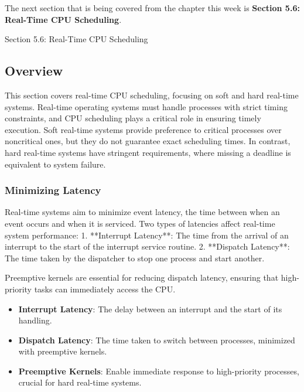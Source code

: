 The next section that is being covered from the chapter this week is \textbf{Section 5.6: Real-Time CPU Scheduling}.

\begin{notes}{Section 5.6: Real-Time CPU Scheduling}
    \subsection*{Overview}

    This section covers real-time CPU scheduling, focusing on soft and hard real-time systems. Real-time operating systems must handle processes with strict timing constraints, and CPU scheduling plays 
    a critical role in ensuring timely execution. Soft real-time systems provide preference to critical processes over noncritical ones, but they do not guarantee exact scheduling times. In contrast, 
    hard real-time systems have stringent requirements, where missing a deadline is equivalent to system failure.
    
    \subsubsection*{Minimizing Latency}
    
    Real-time systems aim to minimize event latency, the time between when an event occurs and when it is serviced. Two types of latencies affect real-time system performance:
    1. **Interrupt Latency**: The time from the arrival of an interrupt to the start of the interrupt service routine.
    2. **Dispatch Latency**: The time taken by the dispatcher to stop one process and start another.
    
    Preemptive kernels are essential for reducing dispatch latency, ensuring that high-priority tasks can immediately access the CPU.
    
    \begin{highlight}
    
        \begin{itemize}
            \item \textbf{Interrupt Latency}: The delay between an interrupt and the start of its handling.
            \item \textbf{Dispatch Latency}: The time taken to switch between processes, minimized with preemptive kernels.
            \item \textbf{Preemptive Kernels}: Enable immediate response to high-priority processes, crucial for hard real-time systems.
        \end{itemize}
    

\end{highlight}
\end{notes}
